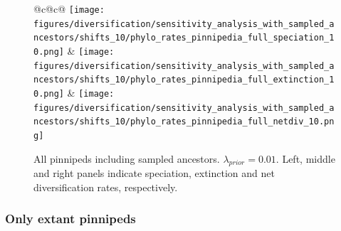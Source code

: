 \documentclass[a4paper, 12pt]{article}
\begin{document}

\begin{figure}[H]
  \centering
  \begin{tabular}{@{}c@{\hspace{.5cm}}c@{}}
  \texttt{[image: figures/diversification/sensitivity\_analysis\_with\_sampled\_ancestors/shifts\_10/phylo\_rates\_pinnipedia\_full\_speciation\_10.png]} &
  \texttt{[image: figures/diversification/sensitivity\_analysis\_with\_sampled\_ancestors/shifts\_10/phylo\_rates\_pinnipedia\_full\_extinction\_10.png]} &
  \texttt{[image: figures/diversification/sensitivity\_analysis\_with\_sampled\_ancestors/shifts\_10/phylo\_rates\_pinnipedia\_full\_netdiv\_10.png]} \\
  \end{tabular}
  \caption{All pinnipeds including sampled ancestors. $\lambda_{prior} = 0.01$. Left, middle and right panels indicate speciation, extinction and net diversification rates, respectively.}
  \label{fig-full-10}
\end{figure}


\subsubsection{Only extant pinnipeds}
\end{document}

